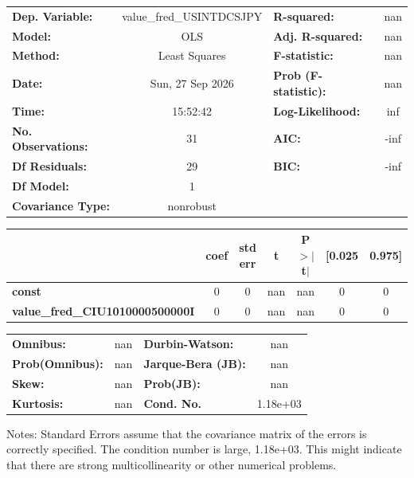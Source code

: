 \begin{center}
\begin{tabular}{lclc}
\toprule
\textbf{Dep. Variable:}                 & value\_fred\_USINTDCSJPY & \textbf{  R-squared:         } &       nan   \\
\textbf{Model:}                         &           OLS            & \textbf{  Adj. R-squared:    } &       nan   \\
\textbf{Method:}                        &      Least Squares       & \textbf{  F-statistic:       } &       nan   \\
\textbf{Date:}                          &     Sun, 27 Sep 2026     & \textbf{  Prob (F-statistic):} &      nan    \\
\textbf{Time:}                          &         15:52:42         & \textbf{  Log-Likelihood:    } &       inf   \\
\textbf{No. Observations:}              &              31          & \textbf{  AIC:               } &      -inf   \\
\textbf{Df Residuals:}                  &              29          & \textbf{  BIC:               } &      -inf   \\
\textbf{Df Model:}                      &               1          & \textbf{                     } &             \\
\textbf{Covariance Type:}               &        nonrobust         & \textbf{                     } &             \\
\bottomrule
\end{tabular}
\begin{tabular}{lcccccc}
                                        & \textbf{coef} & \textbf{std err} & \textbf{t} & \textbf{P$> |$t$|$} & \textbf{[0.025} & \textbf{0.975]}  \\
\midrule
\textbf{const}                          &            0  &            0     &       nan  &           nan        &            0    &            0     \\
\textbf{value\_fred\_CIU1010000500000I} &            0  &            0     &       nan  &           nan        &            0    &            0     \\
\bottomrule
\end{tabular}
\begin{tabular}{lclc}
\textbf{Omnibus:}       &    nan & \textbf{  Durbin-Watson:     } &      nan  \\
\textbf{Prob(Omnibus):} &    nan & \textbf{  Jarque-Bera (JB):  } &      nan  \\
\textbf{Skew:}          &    nan & \textbf{  Prob(JB):          } &      nan  \\
\textbf{Kurtosis:}      &    nan & \textbf{  Cond. No.          } & 1.18e+03  \\
\bottomrule
\end{tabular}
\end{center}

Notes: \newline
 [1] Standard Errors assume that the covariance matrix of the errors is correctly specified. \newline
 [2] The condition number is large, 1.18e+03. This might indicate that there are \newline
 strong multicollinearity or other numerical problems.